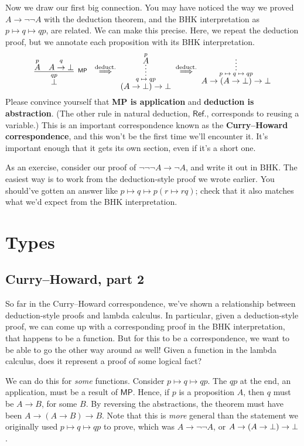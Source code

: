 \documentclass[11pt,paper=letter]{scrartcl}
\newcommand{\sf}{\mathsf}
\renewcommand{\lnot}{\neg}
\newcommand{\vc}[1]{\vcenter{\hbox{#1}}}
\begin{document}
Now we draw our first big connection. You may have noticed the way we proved $A \to \lnot\lnot A$ with the deduction theorem, and the BHK interpretation as $p \mapsto q \mapsto qp$, are related. We can make this precise. Here, we repeat the deduction proof, but we annotate each proposition with its BHK interpretation.
\begin{align*}
\vc{\infer[^\sf{MP}]
{
\overset{qp}{\false}
}
{\overset{p}{A} & \overset{q}{A \to \false}}
}
\;\overset{\text{deduct.}}{\implies}\;
\vc{\infer*
{\overset{q\;\mapsto\;qp}{(A \to \false) \to \false}}
{\overset{p}{A}}}
\;\overset{\text{deduct.}}{\implies}\;
\vc{\infer*
{\overset{p\;\mapsto\;q\;\mapsto\;qp}{A \to (A \to \false) \to \false}}
{}}
\end{align*}
Please convince yourself that \textbf{\textsf{MP} is application} and \textbf{deduction is abstraction}. (The other rule in natural deduction, $\sf{Ref.}$, corresponds to reusing a variable.) This is an important correspondence known as the \textbf{Curry--Howard correspondence}, and this won't be the first time we'll encounter it. It's important enough that it gets its own section, even if it's a short one.

As an exercise, consider our proof of $\lnot\lnot\lnot A \to \lnot A$, and write it out in BHK. The easiest way is to work from the deduction-style proof we wrote earlier. You should've gotten an answer like $p \mapsto q \mapsto p(r \mapsto rq)$; check that it also matches what we'd expect from the BHK interpretation.

\clearpage

\section{Types}

\subsection{Curry--Howard, part 2}

So far in the Curry--Howard correspondence, we've shown a relationship between deduction-style proofs and lambda calculus. In particular, given a deduction-style proof, we can come up with a corresponding proof in the BHK interpretation, that happens to be a function. But for this to be a correspondence, we want to be able to go the other way around as well! Given a function in the lambda calculus, does it represent a proof of some logical fact?

We can do this for \textit{some} functions. Consider $p \mapsto q \mapsto qp$. The $qp$ at the end, an application, must be a result of $\sf{MP}$. Hence, if $p$ is a proposition $A$, then $q$ must be $A \to B$, for some $B$. By reversing the abstractions, the theorem must have been $A \to (A \to B) \to B$. Note that this is \emph{more} general than the statement we originally used $p \mapsto q \mapsto qp$ to prove, which was $A \to \lnot\lnot A$, or $A \to (A \to \bot) \to \bot$.
\end{document}
